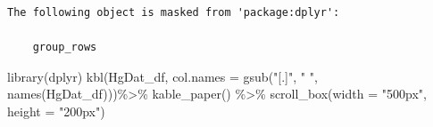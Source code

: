 \documentclass[
  letterpaper,
  DIV=11,
  numbers=noendperiod]{scrartcl}
\newenvironment{Shaded}{\begin{snugshade}}{\end{snugshade}}
\newcommand{\AttributeTok}[1]{\textcolor[rgb]{0.40,0.45,0.13}{#1}}
\newcommand{\FunctionTok}[1]{\textcolor[rgb]{0.28,0.35,0.67}{#1}}
\newcommand{\NormalTok}[1]{\textcolor[rgb]{0.00,0.23,0.31}{#1}}
\newcommand{\SpecialCharTok}[1]{\textcolor[rgb]{0.37,0.37,0.37}{#1}}
\newcommand{\StringTok}[1]{\textcolor[rgb]{0.13,0.47,0.30}{#1}}
\begin{document}
\begin{verbatim}
The following object is masked from 'package:dplyr':

    group_rows
\end{verbatim}

\begin{Shaded}
\begin{Highlighting}[]
\FunctionTok{library}\NormalTok{(dplyr)}
\FunctionTok{kbl}\NormalTok{(HgDat\_df, }\AttributeTok{col.names =} \FunctionTok{gsub}\NormalTok{(}\StringTok{"[.]"}\NormalTok{, }\StringTok{" "}\NormalTok{, }\FunctionTok{names}\NormalTok{(HgDat\_df)))}\SpecialCharTok{\%\textgreater{}\%}
  \FunctionTok{kable\_paper}\NormalTok{() }\SpecialCharTok{\%\textgreater{}\%}
  \FunctionTok{scroll\_box}\NormalTok{(}\AttributeTok{width =} \StringTok{"500px"}\NormalTok{, }\AttributeTok{height =} \StringTok{"200px"}\NormalTok{)}
\end{Highlighting}
\end{Shaded}
\end{document}
